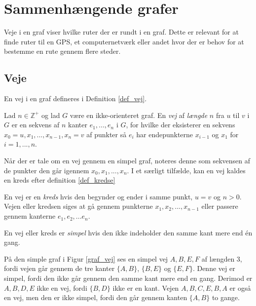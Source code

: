 \chapter{Sammenhængende grafer}
Veje i en graf viser hvilke ruter der er rundt i en graf. Dette er relevant for at finde ruter til en GPS, et computernetværk eller andet hvor der er behov for at bestemme en rute gennem flere steder. 

\section{Veje}
En vej i en graf defineres i Definition \ref{def_vej}.

\begin{defn}
\label{def_vej}
Lad $n \in  \mathbb{Z}^{+}$ og lad $G$ være en ikke-orienteret graf. 
En \textit{vej} af \textit{længde} $n$ fra $u$ til $v$ i $G$ er en sekvens af $n$ kanter $e_1, ..., e_n$ i $G$, for hvilke der eksisterer en sekvens $x_0=u,x_1,...,x_{n-1},x_n=v$ af punkter så $e_i$ har endepunkterne $x_{i-1}$ og $x_1$ for $i=1,...,n$.
\end{defn}

\noindent Når der er tale om en vej gennem en simpel graf, noteres denne som sekvensen af de punkter den går igennem $x_0, x_1,...,x_n$. 
I et særligt tilfælde, kan en vej kaldes en kreds efter definition \ref{def_kredse}

\begin{defn}
\label{def_kredse}
En vej er en \textit{kreds} hvis den begynder og ender i samme punkt, $u=v$ og $n>0$.
Vejen eller kredsen siges at gå gennem punkterne $x_1,x_2,...,x_{n-1}$ eller passere gennem kanterne $e_1, e_2,...e_n$.
\end{defn}

\noindent En vej eller kreds er \textit{simpel} hvis den ikke indeholder den samme kant mere end én gang. 

\begin{exmp}
\label{ex_vej}
På den simple graf i Figur \ref{graf_vej} ses en simpel vej $A,B,E,F$ af længden 3, fordi vejen går gennem de tre kanter $\lbrace A,B \rbrace$, $\lbrace B,E \rbrace$ og $\lbrace E,F \rbrace$. 
Denne vej er simpel, fordi den ikke går gennem den samme kant mere end en gang. 
Derimod er $A,B,D,E$ ikke en vej, fordi $\lbrace B,D \rbrace$ ikke er en kant. 
Vejen $A,B,C,E,B,A$ er også en vej, men den er ikke simpel, fordi den går gennem kanten $\lbrace A,B \rbrace$ to gange. 

\end{exmp}

